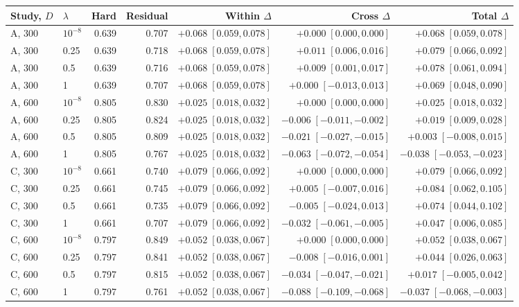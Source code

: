 \begin{tabular}{llrrrrr}
\toprule
Study, $D$ & $\lambda$ & Hard & Residual & Within $\Delta$ & Cross $\Delta$ & Total $\Delta$ \\
\midrule
A, 300 & $10^{-8}$ & 0.639 & 0.707 & $+0.068\;[0.059,0.078]$ & $+0.000\;[0.000,0.000]$ & $+0.068\;[0.059,0.078]$ \\
A, 300 & 0.25 & 0.639 & 0.718 & $+0.068\;[0.059,0.078]$ & $+0.011\;[0.006,0.016]$ & $+0.079\;[0.066,0.092]$ \\
A, 300 & 0.5 & 0.639 & 0.716 & $+0.068\;[0.059,0.078]$ & $+0.009\;[0.001,0.017]$ & $+0.078\;[0.061,0.094]$ \\
A, 300 & 1 & 0.639 & 0.707 & $+0.068\;[0.059,0.078]$ & $+0.000\;[-0.013,0.013]$ & $+0.069\;[0.048,0.090]$ \\
A, 600 & $10^{-8}$ & 0.805 & 0.830 & $+0.025\;[0.018,0.032]$ & $+0.000\;[0.000,0.000]$ & $+0.025\;[0.018,0.032]$ \\
A, 600 & 0.25 & 0.805 & 0.824 & $+0.025\;[0.018,0.032]$ & $-0.006\;[-0.011,-0.002]$ & $+0.019\;[0.009,0.028]$ \\
A, 600 & 0.5 & 0.805 & 0.809 & $+0.025\;[0.018,0.032]$ & $-0.021\;[-0.027,-0.015]$ & $+0.003\;[-0.008,0.015]$ \\
A, 600 & 1 & 0.805 & 0.767 & $+0.025\;[0.018,0.032]$ & $-0.063\;[-0.072,-0.054]$ & $-0.038\;[-0.053,-0.023]$ \\
C, 300 & $10^{-8}$ & 0.661 & 0.740 & $+0.079\;[0.066,0.092]$ & $+0.000\;[0.000,0.000]$ & $+0.079\;[0.066,0.092]$ \\
C, 300 & 0.25 & 0.661 & 0.745 & $+0.079\;[0.066,0.092]$ & $+0.005\;[-0.007,0.016]$ & $+0.084\;[0.062,0.105]$ \\
C, 300 & 0.5 & 0.661 & 0.735 & $+0.079\;[0.066,0.092]$ & $-0.005\;[-0.024,0.013]$ & $+0.074\;[0.044,0.102]$ \\
C, 300 & 1 & 0.661 & 0.707 & $+0.079\;[0.066,0.092]$ & $-0.032\;[-0.061,-0.005]$ & $+0.047\;[0.006,0.085]$ \\
C, 600 & $10^{-8}$ & 0.797 & 0.849 & $+0.052\;[0.038,0.067]$ & $+0.000\;[0.000,0.000]$ & $+0.052\;[0.038,0.067]$ \\
C, 600 & 0.25 & 0.797 & 0.841 & $+0.052\;[0.038,0.067]$ & $-0.008\;[-0.016,0.001]$ & $+0.044\;[0.026,0.063]$ \\
C, 600 & 0.5 & 0.797 & 0.815 & $+0.052\;[0.038,0.067]$ & $-0.034\;[-0.047,-0.021]$ & $+0.017\;[-0.005,0.042]$ \\
C, 600 & 1 & 0.797 & 0.761 & $+0.052\;[0.038,0.067]$ & $-0.088\;[-0.109,-0.068]$ & $-0.037\;[-0.068,-0.003]$ \\
\bottomrule
\end{tabular}
